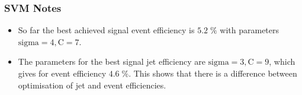 \subsubsection{SVM Notes}

\begin{itemize}
\item So far the best achieved signal event efficiency is $5.2\;\%$
  with parameters $\textrm{sigma}=4, \textrm{C}=7$.
\item The parameters for the best signal jet efficiency are
  $\textrm{sigma}=3,\textrm{C}=9$, which gives for event efficiency
  $4.6\;\%$. This shows that there is a difference between
  optimisation of jet and event efficiencies.
\end{itemize}

